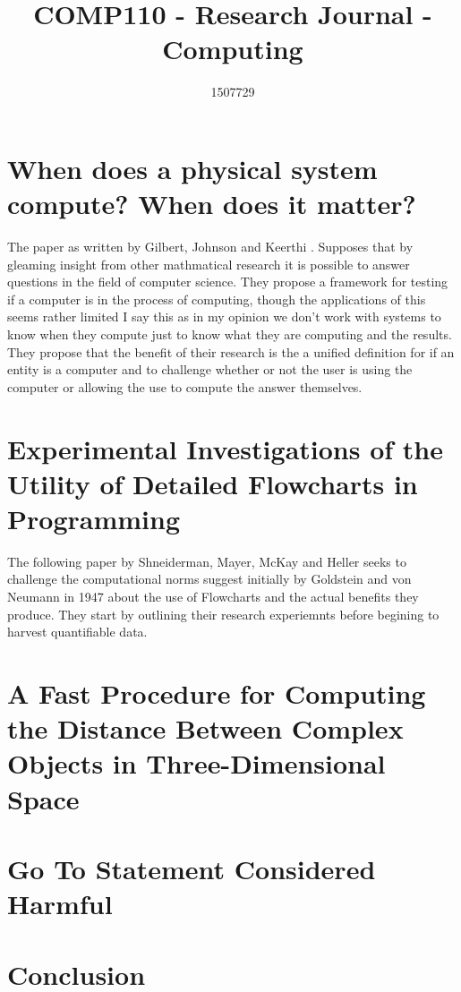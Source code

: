 \documentclass{scrartcl}
\title{COMP110 - Research Journal - Computing}
\author{1507729}
\begin{document}
\maketitle

\section{When does a physical system compute? When does it matter?}
The paper as written by Gilbert, Johnson and Keerthi \cite{horsman2014does}. Supposes that by gleaming insight from other mathmatical research it is possible to answer questions in the field of computer science. They propose a framework for testing if a computer is in the process of computing, though the applications of this seems rather limited I say this as in my opinion we don't work with systems to know when they compute just to know what they are computing and the results. They propose that the benefit of their research is the a unified definition for if an entity is a computer and to challenge whether or not the user is using the computer or allowing the use to compute the answer themselves.

\section{Experimental Investigations of the Utility of Detailed Flowcharts in Programming}
The following paper by Shneiderman, Mayer, McKay and Heller \cite{shneiderman1977experimental}  seeks to challenge the computational norms suggest initially by Goldstein and von Neumann \cite{goldstein5planning} in 1947 about the use of Flowcharts and the actual benefits they produce. They start by outlining their research experiemnts before begining to harvest quantifiable data. 

\section{A Fast Procedure for Computing the Distance Between Complex Objects in Three-Dimensional Space}

\section{Go To Statement Considered Harmful}

\section{Conclusion}



\end{document}
